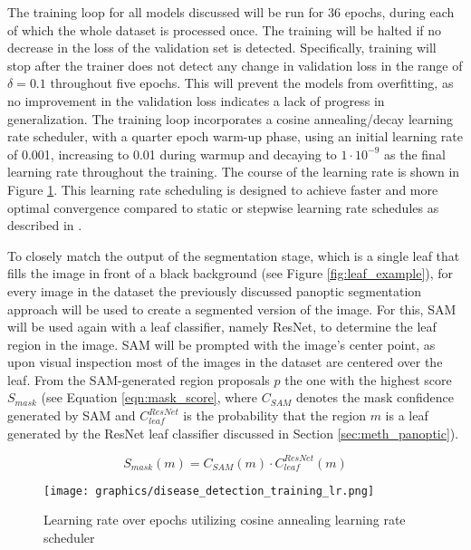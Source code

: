 \documentclass[draft,final]{vutinfth} %
\begin{document}
The training loop for all models discussed will be run for 36 epochs, during each of which the whole dataset is processed once. The training will be halted if no decrease in the loss of the validation set is detected. Specifically, training will stop after the trainer does not detect any change in validation loss in the range of $\delta = 0.1$ throughout five epochs. This will prevent the models from overfitting, as no improvement in the validation loss indicates a lack of progress in generalization.
The training loop incorporates a cosine annealing/decay learning rate scheduler, with a quarter epoch warm-up phase, using an initial learning rate of 0.001, increasing to 0.01 during warmup and decaying to $1 \cdot 10^{-9}$ as the final learning rate throughout the training. The course of the learning rate is shown in Figure \ref{fig:disease_detection_lr}. This learning rate scheduling is designed to achieve faster and more optimal convergence compared to static or stepwise learning rate schedules as described in \cite{liu_super_2022}.

To closely match the output of the segmentation stage, which is a single leaf that fills the image in front of a black background (see Figure \ref{fig:leaf_example}), for every image in the dataset the previously discussed panoptic segmentation approach will be used to create a segmented version of the image. For this, SAM will be used again with a leaf classifier, namely ResNet, to determine the leaf region in the image. SAM will be prompted with the image's center point, as upon visual inspection most of the images in the dataset are centered over the leaf. From the SAM-generated region proposals $p$ the one with the highest score $S_{mask}$ (see Equation \eqref{eqn:mask_score}, where $C_{SAM}$ denotes the mask confidence generated by SAM and $C_{leaf}^{ResNet}$ is the probability that the region $m$ is a leaf generated by the ResNet leaf classifier discussed in Section \ref{sec:meth_panoptic}).

\begin{equation} \label{eqn:mask_score}
    S_{mask}(m) = C_{SAM}(m) \cdot C_{leaf}^{ResNet}(m)
\end{equation}

\begin{figure}
    \centering
    \texttt{[image: graphics/disease\_detection\_training\_lr.png]}
    \caption{Learning rate over epochs utilizing cosine annealing learning rate scheduler}
    \label{fig:disease_detection_lr}
\end{figure}
\end{document}
